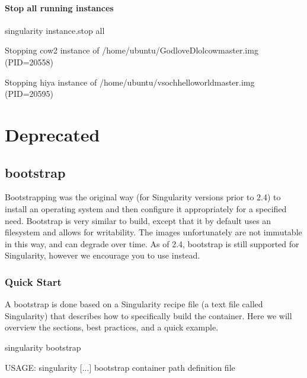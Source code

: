 \documentclass[letterpaper,10pt,english]{sphinxmanual}
\begin{document}
\paragraph{Stop all running instances}
\label{\detokenize{appendix:stop-all-running-instances}}
%
\begin{sphinxVerbatim}[commandchars=\\\{\}]
\PYGZdl{} singularity instance.stop \PYGZhy{}\PYGZhy{}all

Stopping cow2 instance of /home/ubuntu/GodloveD\PYGZhy{}lolcow\PYGZhy{}master.img (PID=20558)

Stopping hiya instance of /home/ubuntu/vsoch\PYGZhy{}hello\PYGZhy{}world\PYGZhy{}master.img (PID=20595)
\end{sphinxVerbatim}


\section{Deprecated}
\label{\detokenize{appendix:deprecated}}

\subsection{bootstrap}
\label{\detokenize{appendix:bootstrap}}\label{\detokenize{appendix:id53}}\label{\detokenize{appendix:sec-bootstrap}}
Bootstrapping was the original way (for Singularity versions prior to
2.4) to install an operating system and then configure it appropriately
for a specified need. Bootstrap is very similar to build, except that it
by default uses an  filesystem and allows for writability. The
images unfortunately are not immutable in this way, and can degrade over
time. As of 2.4, bootstrap is still supported for Singularity, however
we encourage you to use {\hyperref[\detokenize{build_a_container:build-a-container}]{}} instead.


\subsubsection{Quick Start}
\label{\detokenize{appendix:quick-start}}
A bootstrap is done based on a Singularity recipe file (a text file
called Singularity) that describes how to specifically build the
container. Here we will overview the sections, best practices, and a
quick example.

%
\begin{sphinxVerbatim}[commandchars=\\\{\}]
\PYGZdl{} singularity bootstrap

USAGE: singularity [...] bootstrap \PYGZlt{}container path\PYGZgt{} \PYGZlt{}definition file\PYGZgt{}
\end{sphinxVerbatim}
\end{document}
